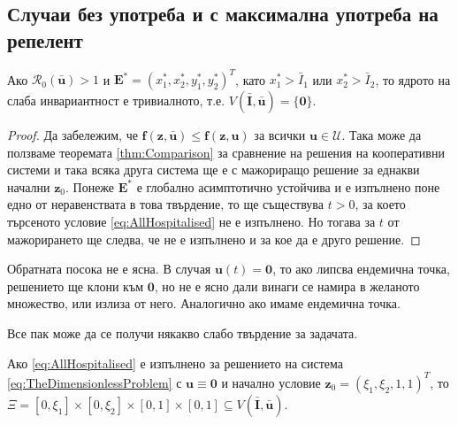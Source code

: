 \subsection{Случаи без употреба и с максимална употреба на репелент}

\begin{proposition}
  Ако $\mathscr{R}_0(\bar{\mathbf{u}}) > 1$ и $\mathbf{E}^* = (x_1^*, x_2^*, y_1^*, y_2^*)^T$, като $x_1^* > \bar{I}_1$ или $x_2^* > \bar{I}_2$, то ядрото на слаба инвариантност е тривиалното, т.е. $V(\bar{\mathbf{I}}, \bar{\mathbf{u}}) = \{\mathbf{0}\}$.
\end{proposition}

\begin{proof}
  Да забележим, че $\mathbf{f}(\mathbf{z}, \bar{\mathbf{u}}) \leq \mathbf{f}(\mathbf{z}, \mathbf{u})$ за всички $\mathbf{u} \in \mathscr{U}$.
  Така може да ползваме теоремата \eqref{thm:Comparison} за сравнение на решения на кооперативни системи и така всяка друга система ще е с мажориращо решение за еднакви начални $\mathbf{z}_0$.
  Понеже $\mathbf{E}^*$ е глобално асимптотично устойчива и е изпълнено поне едно от неравенствата в това твърдение, то ще съществува $t > 0$, за което търсеното условие \eqref{eq:AllHospitalised} не е изпълнено.
  Но тогава за $t$ от мажорирането ще следва, че не е изпълнено и за кое да е друго решение.
\end{proof}

Обратната посока не е ясна. В случая $\mathbf{u}(t)=\mathbf{0}$, то ако липсва ендемична точка, решението ще клони към $\mathbf{0}$, но не е ясно дали винаги се намира в желаното множество, или излиза от него. Аналогично ако имаме ендемична точка.

Все пак може да се получи някакво слабо твърдение за задачата.

\begin{proposition}
  Ако \eqref{eq:AllHospitalised} е изпълнено за решението на система \eqref{eq:TheDimensionlessProblem} с $\mathbf{u} \equiv \mathbf{0}$ и начално условие $\mathbf{z}_0 = (\xi_1, \xi_2, 1, 1)^T$, то $\Xi = [0, \xi_1] \times [0, \xi_2] \times [0, 1] \times [0, 1] \subseteq V(\bar{\mathbf{I}}, \bar{\mathbf{u}})$.
\end{proposition}

